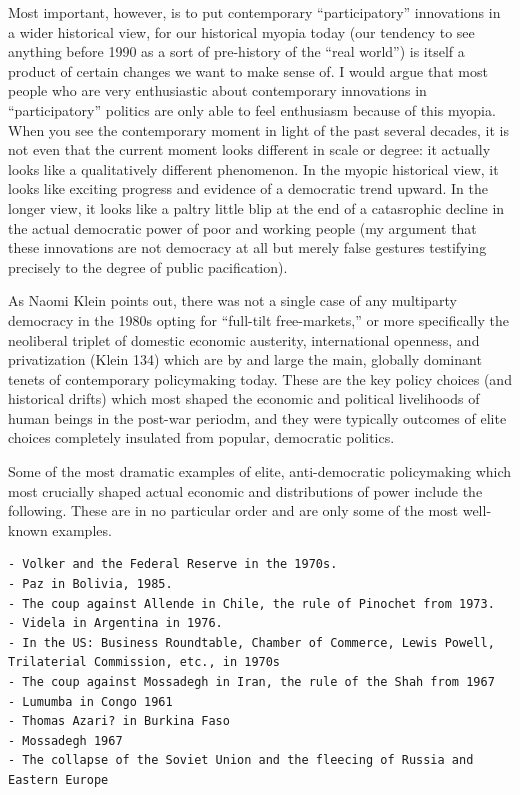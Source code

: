 \documentclass[12pt,book]{article}
\begin{document}
Most important, however, is to put contemporary ``participatory''
innovations in a wider historical view, for our historical myopia today
(our tendency to see anything before 1990 as a sort of pre-history of
the ``real world'') is itself a product of certain changes we want to
make sense of. I would argue that most people who are very enthusiastic
about contemporary innovations in ``participatory'' politics are only
able to feel enthusiasm because of this myopia. When you see the
contemporary moment in light of the past several decades, it is not even
that the current moment looks different in scale or degree: it actually
looks like a qualitatively different phenomenon. In the myopic
historical view, it looks like exciting progress and evidence of a
democratic trend upward. In the longer view, it looks like a paltry
little blip at the end of a catasrophic decline in the actual democratic
power of poor and working people (my argument that these innovations are
not democracy at all but merely false gestures testifying precisely to
the degree of public pacification).

As Naomi Klein points out, there was not a single case of any multiparty
democracy in the 1980s opting for ``full-tilt free-markets,'' or more
specifically the neoliberal triplet of domestic economic austerity,
international openness, and privatization (Klein 134) which are by and
large the main, globally dominant tenets of contemporary policymaking
today. These are the key policy choices (and historical drifts) which
most shaped the economic and political livelihoods of human beings in
the post-war periodm, and they were typically outcomes of elite choices
completely insulated from popular, democratic politics.

Some of the most dramatic examples of elite, anti-democratic
policymaking which most crucially shaped actual economic and
distributions of power include the following. These are in no particular
order and are only some of the most well-known examples.

\begin{verbatim}
- Volker and the Federal Reserve in the 1970s.
- Paz in Bolivia, 1985.
- The coup against Allende in Chile, the rule of Pinochet from 1973.
- Videla in Argentina in 1976.
- In the US: Business Roundtable, Chamber of Commerce, Lewis Powell, Trilaterial Commission, etc., in 1970s
- The coup against Mossadegh in Iran, the rule of the Shah from 1967
- Lumumba in Congo 1961
- Thomas Azari? in Burkina Faso
- Mossadegh 1967
- The collapse of the Soviet Union and the fleecing of Russia and Eastern Europe
\end{verbatim}
\end{document}
